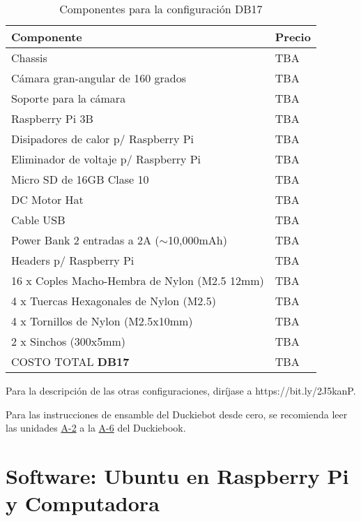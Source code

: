 \documentclass[12pt]{article}
\begin{document}
\begin{table}[h]
\centering
\caption{Componentes para la configuración DB17}
\label{my-label}
\begin{tabular}{@{}ll@{}}
\toprule
Componente                                    & Precio \\ \midrule
Chassis                                       & TBA    \\
Cámara gran-angular de 160 grados             & TBA    \\
Soporte para la cámara                        & TBA    \\
Raspberry Pi 3B                               & TBA    \\
Disipadores de calor p/ Raspberry Pi          & TBA    \\
Eliminador de voltaje p/ Raspberry Pi         & TBA    \\
Micro SD de 16GB Clase 10                     & TBA    \\
DC Motor Hat                                  & TBA    \\
Cable USB                                     & TBA    \\
Power Bank 2 entradas a 2A ($\sim$10,000mAh)  & TBA    \\
Headers p/ Raspberry Pi                       & TBA    \\
16 x Coples Macho-Hembra de Nylon (M2.5 12mm) & TBA    \\
4 x Tuercas Hexagonales de Nylon (M2.5)       & TBA    \\
4 x Tornillos de Nylon (M2.5x10mm)            & TBA    \\
2 x Sinchos (300x5mm)                         & TBA    \\
COSTO TOTAL \textbf{DB17}    & TBA    \\ \bottomrule
\end{tabular}
\end{table}

Para la descripción de las otras configuraciones, diríjase a https://bit.ly/2J5kanP.

Para las instrucciones de ensamble del Duckiebot desde cero, se recomienda leer las unidades \href{https://bit.ly/2H4EqDV}{A-2} a la \href{https://bit.ly/2L3H536}{A-6} del Duckiebook.


\section{Software: Ubuntu en Raspberry Pi y Computadora}
\end{document}
